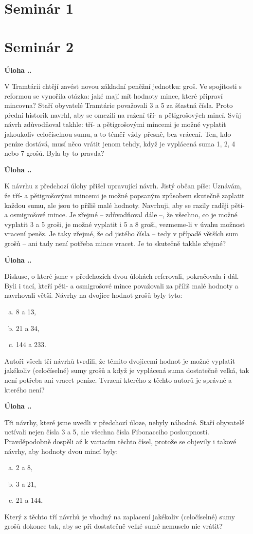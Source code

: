 \documentclass{article}
\newcounter{seminar}
\newcounter{problem}
\newcommand{\seminar}[1]{
  \clearpage
  \setcounter{seminar}{#1}
  \setcounter{problem}{0}
  \section*{Seminár #1}
}
\newcommand{\source}[1]{
  \def\temp{#1}\ifx\temp\empty
  \else
    [#1]
  \fi
}
\newcommand{\problem}[3]{
  \stepcounter{problem}
  \noindent\textbf{Úloha \theseminar .\theproblem.}
    \source{#1} #2
  \bigskip
}
\begin{document}
\seminar{1}

\seminar{2}

\problem{}{
V Tramtárii chtějí zavést novou základní peněžní jednotku: groš. Ve spojitosti s reformou se vynořila otázka: jaké mají mít hodnoty mince, které připraví mincovna? Staří obyvatelé Tramtárie považovali 3 a 5 za šťastná čísla. Proto přední historik navrhl, aby se omezili na ražení tří- a pětigrošových mincí. Svůj návrh zdůvodňoval takhle: tří- a pětigrošovými mincemi je možné vyplatit jakoukoliv celočíselnou sumu, a to téměř vždy přesně, bez vrácení. Ten, kdo peníze dostává, musí něco vrátit jenom tehdy, když je vyplácená suma 1, 2, 4 nebo 7 grošů. Byla by to pravda?

}{

}



\problem{}{
K návrhu z předchozí úlohy přišel upravující návrh. Jistý občan píše: Uznávám, že tří- a pětigrošovými mincemi je možné popsaným způsobem skutečně zaplatit každou sumu, ale jsou to příliš malé hodnoty. Navrhuji, aby se razily raději pěti- a osmigrošové mince. Je zřejmé -- zdůvodňoval dále --, že všechno, co je možné vyplatit 3 a 5 groši, je možné vyplatit i 5 a 8 groši, vezmeme-li v úvahu možnost vracení peněz. Je taky zřejmé, že od jistého čísla -- tedy v případě větších sum grošů -- ani tady není potřeba mince vracet. Je to skutečně takhle zřejmé?
}{
}



\problem{}{
Diskuse, o které jsme v předchozích dvou úlohách referovali, pokračovala i dál. Byli i tací, kteří pěti- a osmigrošové mince považovali za příliš malé hodnoty a navrhovali větší. Návrhy na dvojice hodnot grošů byly tyto:
\begin{enumerate}[a)]
\item 8 a 13,
\item 21 a 34, 
\item 144 a 233.
\end{enumerate}
Autoři všech tří návrhů tvrdili, že těmito dvojicemi hodnot je možné vyplatit jakékoliv (celočíselné) sumy grošů a když je vyplácená suma dostatečně velká, tak není potřeba ani vracet peníze. Tvrzení kterého z těchto autorů je správné a kterého není?
}{
}



\problem{}{
Tři návrhy, které jsme uvedli v předchozí úloze, nebyly náhodné. Staří obyvatelé uctívali nejen čísla 3 a 5, ale všechna čísla Fibonacciho posloupnosti. Pravděpodobně dospěli až k variacím těchto čísel, protože se objevily i takové návrhy, aby hodnoty dvou mincí byly:
\begin{enumerate}[a)]
\item 2 a 8,
\item 3 a 21, 
\item 21 a 144.
\end{enumerate}
Který z těchto tří návrhů je vhodný na zaplacení jakékoliv (celočíselné) sumy grošů dokonce tak, aby se při dostatečně velké sumě nemuselo nic vrátit?
}{
}
\end{document}
